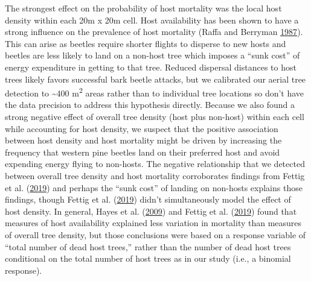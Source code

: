 \documentclass[twoside,12pt,final]{ucthesis-CA2012}
\begin{document}
\begin{ucmainmatter}
The strongest effect on the probability of host mortality was the local
host density within each 20m x 20m cell. Host availability has been
shown to have a strong influence on the prevalence of host mortality
(Raffa and Berryman \protect\hyperlink{ref-raffa1987}{1987}). This can
arise as beetles require shorter flights to disperse to new hosts and
beetles are less likely to land on a non-host tree which imposes a
``sunk cost'' of energy expenditure in getting to that tree. Reduced
dispersal distances to host trees likely favors successful bark beetle
attacks, but we calibrated our aerial tree detection to
\textasciitilde{}400 m\textsuperscript{2} areas rather than to
individual tree locations so don't have the data precision to address
this hypothesis directly. Because we also found a strong negative effect
of overall tree density (host plus non-host) within each cell while
accounting for host density, we suspect that the positive association
between host density and host mortality might be driven by increasing
the frequency that western pine beetles land on their preferred host and
avoid expending energy flying to non-hosts. The negative relationship
that we detected between overall tree density and host mortality
corroborates findings from Fettig et al.
(\protect\hyperlink{ref-fettig2019}{2019}) and perhaps the ``sunk cost''
of landing on non-hosts explains those findings, though Fettig et al.
(\protect\hyperlink{ref-fettig2019}{2019}) didn't simultaneously model
the effect of host density. In general, Hayes et al.
(\protect\hyperlink{ref-hayes2009}{2009}) and Fettig et al.
(\protect\hyperlink{ref-fettig2019}{2019}) found that measures of host
availability explained less variation in mortality than measures of
overall tree density, but those conclusions were based on a response
variable of ``total number of dead host trees,'' rather than the number
of dead host trees conditional on the total number of host trees as in
our study (i.e., a binomial response).


\end{ucmainmatter}
\end{document}
